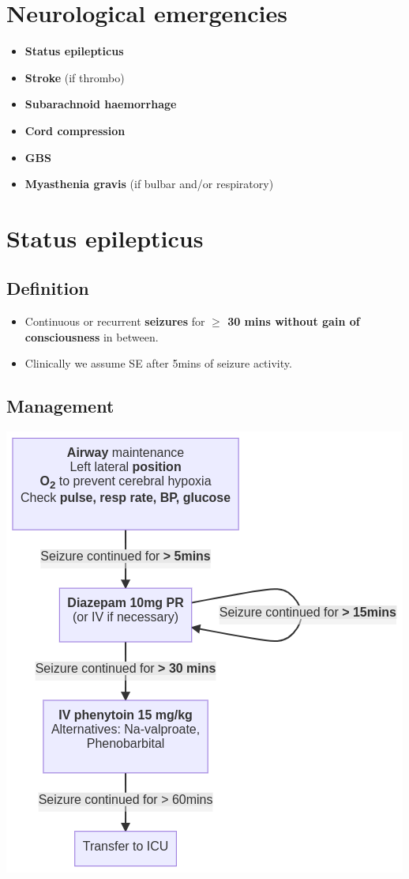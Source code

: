 \documentclass[
  12pt,
]{memoir}
\providecommand{\tightlist}{%
  \setlength{\itemsep}{0pt}\setlength{\parskip}{0pt}}
\begin{document}
\hypertarget{neurological-emergencies}{%
\section{Neurological emergencies}\label{neurological-emergencies}}

\begin{itemize}
\tightlist
\item
  \textbf{Status epilepticus}
\item
  \textbf{Stroke} (if thrombo)
\item
  \textbf{Subarachnoid haemorrhage}
\item
  \textbf{Cord compression}
\item
  \textbf{GBS}
\item
  \textbf{Myasthenia gravis} (if bulbar and/or respiratory)
\end{itemize}

\pagebreak

\hypertarget{status-epilepticus}{%
\section{Status epilepticus}\label{status-epilepticus}}

\hypertarget{definition-1}{%
\subsection{Definition}\label{definition-1}}

\begin{itemize}
\tightlist
\item
  Continuous or recurrent \textbf{seizures} for \textbf{\(\ge\) 30 mins
  without gain of consciousness} in between.
\item
  Clinically we assume SE after 5mins of seizure activity.
\end{itemize}

\hypertarget{management-5}{%
\subsection{Management}\label{management-5}}

\includegraphics[width=.7\textwidth]{../assets/med/stat-epi.png}
\end{document}
